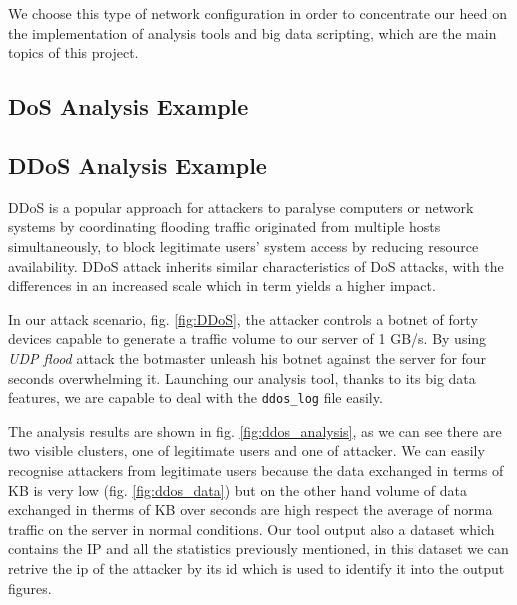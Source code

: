 We choose this type of network configuration in order to concentrate our heed on the implementation of analysis tools and big data scripting, which are the main topics of this project.
 


\subsection{DoS Analysis Example}

\subsection{DDoS Analysis Example}
DDoS is a popular approach for attackers to paralyse computers or network systems by coordinating flooding traffic originated from multiple hosts simultaneously, to block legitimate users' system access by reducing resource availability. DDoS attack inherits similar characteristics of DoS attacks, with the differences in an increased scale which in term yields a higher impact\cite{ddos_forensics}.

In our attack scenario, fig. \ref{fig:DDoS},  the attacker controls a botnet of forty devices capable to generate a traffic volume to our server of 1 GB/s. By using \textit{UDP flood} attack the botmaster unleash his botnet against the server for four seconds overwhelming it. Launching our analysis tool, thanks to its big data features, we are capable to deal with the \texttt{ddos\_log} file easily.

The analysis results are shown in fig. \ref{fig:ddos_analysis}, as we can see there are two  visible clusters, one of legitimate users and one of attacker. We can easily recognise attackers from legitimate users because the data exchanged in terms of KB is very low (fig. \ref{fig:ddos_data}) but on the other hand volume of data exchanged in therms of KB over seconds are high respect the average of norma traffic on the server in normal conditions. Our tool output also a dataset which contains the IP and all the statistics previously mentioned, in this dataset we can retrive the ip of the attacker by its id which is used to identify it into the output figures. 












